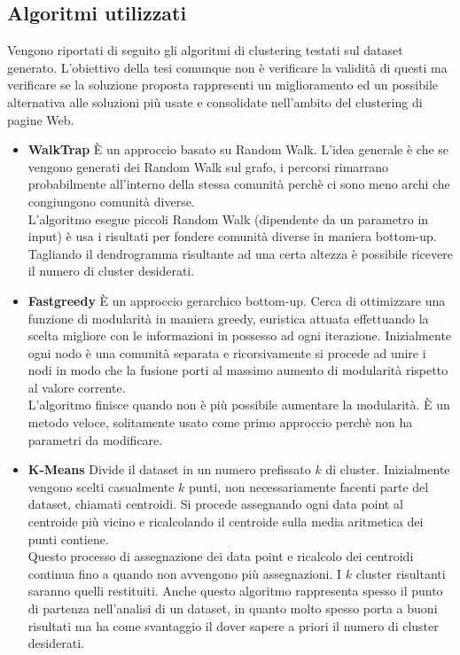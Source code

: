 \subsection{Algoritmi utilizzati}
Vengono riportati di seguito gli algoritmi di clustering testati sul dataset generato. L'obiettivo della tesi comunque non è verificare la validità di questi ma verificare se la soluzione proposta rappresenti un miglioramento ed un possibile alternativa alle soluzioni più usate e consolidate nell'ambito del clustering di pagine Web.
\begin{itemize}
\item \textbf{WalkTrap}
È un approccio basato su Random Walk. L'idea generale è che se vengono generati dei Random Walk sul grafo, i percorsi rimarrano probabilmente all'interno della stessa comunità perchè ci sono meno archi che congiungono comunità diverse. 
\\
L'algoritmo esegue piccoli Random Walk (dipendente da un parametro in input) è usa i risultati per fondere comunità diverse in maniera bottom-up. Tagliando il dendrogramma risultante ad una certa altezza è possibile ricevere il numero di cluster desiderati.

\item \textbf{Fastgreedy}
È un approccio gerarchico bottom-up. Cerca di ottimizzare una funzione di modularità in maniera greedy, euristica attuata effettuando la scelta migliore con le informazioni in possesso ad ogni iterazione.
Inizialmente ogni nodo è una comunità separata e ricorsivamente si procede ad unire i nodi in modo che la fusione porti al massimo aumento di modularità rispetto al valore corrente. 
\\
L'algoritmo finisce quando non è più possibile aumentare la modularità. È un metodo veloce, solitamente usato come primo approccio perchè non ha parametri da modificare.
\item \textbf{K-Means}
Divide il dataset in un numero prefissato $k$ di cluster. Inizialmente vengono scelti casualmente $k$ punti, non necessariamente facenti parte del dataset, chiamati centroidi. Si procede assegnando ogni data point al centroide più vicino e ricalcolando il centroide sulla media aritmetica dei punti contiene. 
\\
Questo processo di assegnazione dei data point e ricalcolo dei centroidi continua fino a quando non avvengono più assegnazioni. I $k$ cluster risultanti saranno quelli restituiti. Anche questo algoritmo rappresenta spesso il punto di partenza nell'analisi di un dataset, in quanto molto spesso porta a buoni risultati ma ha come svantaggio il dover sapere a priori il numero di cluster desiderati.


\end{itemize}
